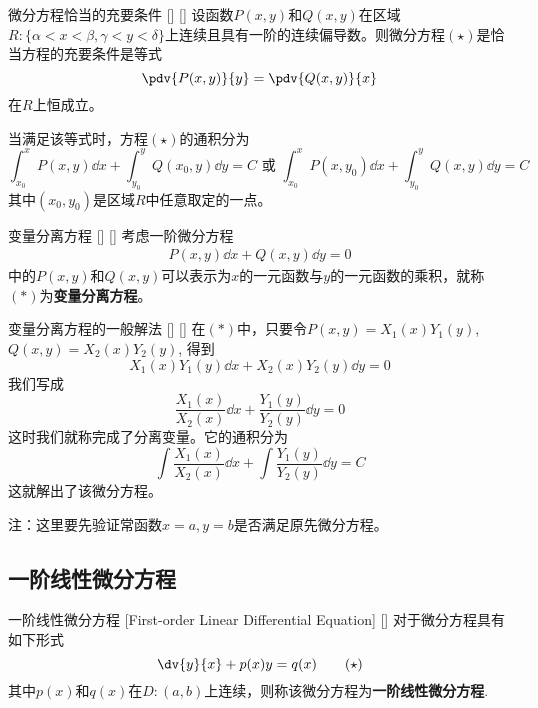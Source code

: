 \documentclass[UTF8]{ctexart}
\begin{document}
        \begin{thm}
            []
            {微分方程恰当的充要条件}
            []
            []
            设函数$P(x,y)$和$Q(x,y)$在区域$R:\{\alpha<x<\beta, \gamma<y<\delta\}$上连续且具有一阶的连续偏导数。则微分方程$(\star)$是恰当方程的充要条件是等式
            \[\pdv{P(x,y)}{y}=\pdv{Q(x,y)}{x}\]
            在$R$上恒成立。

            当满足该等式时，方程$(\star)$的通积分为
            \[\int_{x_0}^{x}P(x,y)\dd{x}+\int_{y_0}^{y}Q(x_0,y)\dd{y}=C\text{ 或 }\int_{x_0}^{x}P(x,y_0)\dd{x}+\int_{y_0}^{y}Q(x,y)\dd{y}=C\]
            其中$(x_0,y_0)$是区域$R$中任意取定的一点。
        \end{thm}

        \begin{dfn}
            []
            {变量分离方程}
            []
            []
            考虑一阶微分方程
            \begin{align*}
                P(x,y)\dd{x}+Q(x,y)\dd{y}=0\tag{$\ast $}
            \end{align*}
            中的$P(x,y)$和$Q(x,y)$可以表示为$x$的一元函数与$y$的一元函数的乘积，就称$(\ast)$为\textbf{变量分离方程}。
        \end{dfn}

        \begin{ppt}
            []
            {变量分离方程的一般解法}
            []
            []
            在$(\ast)$中，只要令$P(x,y)=X_1(x)Y_1(y)$, $Q(x,y)=X_2(x)Y_2(y)$, 得到
            \[X_1(x)Y_1(y)\dd{x}+X_2(x)Y_2(y)\dd{y}=0\]
            我们写成
            \[\frac{X_1(x)}{X_2(x)}\dd{x}+\frac{Y_1(y)}{Y_2(y)}\dd{y}=0\]
            这时我们就称完成了分离变量。它的通积分为
            \[\int\frac{X_1(x)}{X_2(x)}\dd{x}+\int\frac{Y_1(y)}{Y_2(y)}\dd{y}=C\]
            这就解出了该微分方程。

            注：这里要先验证常函数$x=a,y=b$是否满足原先微分方程。
        \end{ppt}

    \subsection{一阶线性微分方程}

        \begin{dfn}
            []
            {一阶线性微分方程}
            [First-order Linear Differential Equation]
            []
            对于微分方程具有如下形式
            \[\dv{y}{x}+p(x)y=q(x)\tag{$\star$}\]
            其中$p(x)$和$q(x)$在$D:(a,b)$上连续，则称该微分方程为\textbf{一阶线性微分方程}.
        \end{dfn}
\end{document}
